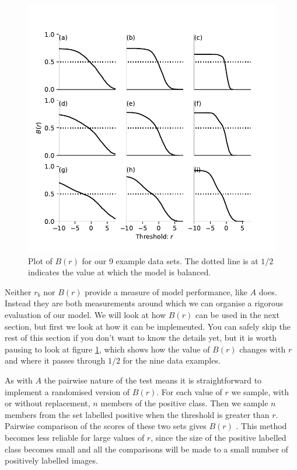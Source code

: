 \documentclass[preprint,12pt]{elsarticle}
\begin{document}
\begin{figure}[t]
\centering
\includegraphics[scale=1]{Article/Figures/Bplot.pdf}
\caption{Plot of $B(r)$ for our 9 example data sets. The dotted line is at $1/2$ indicates the value at which the model is balanced.}
\label{fig:Bplot}
\end{figure}

Neither $r_b$ nor $B(r)$ provide a measure of model performance, like $A$ does. Instead they are both measurements around which we can organise a rigorous evaluation of our model. We will look at how $B(r)$ can be used in the next section, but first we look at how it can be implemented. You can safely skip the rest of this section if you don't want to know the details yet, but it is worth pausing to look at figure \ref{fig:Bplot}, which shows how the value of $B(r)$ changes with $r$ and where it passes through $1/2$ for the nine data examples.

As with $A$ the pairwise nature of the test means it is straightforward to implement a randomised version of $B(r)$. For each value of $r$ we sample, with or without replacement, $n$ members of the positive class. Then we sample $n$ members from the set labelled positive when the threshold is greater than $r$. Pairwise comparison of the scores of these two sets gives $B(r)$ . This method becomes less reliable for large values of $r$, since the size of the positive labelled class becomes small and all the comparisons will be made to a small number of positively labelled images. 
\end{document}

